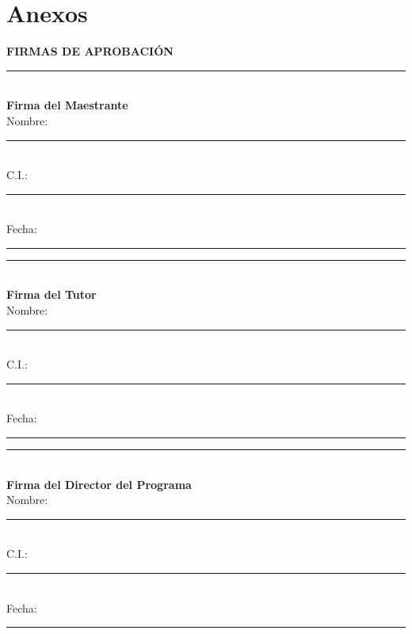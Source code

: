 \documentclass[12pt,a4paper]{report}
\begin{document}


\tableofcontents
\listoffigures
\listoftables

\lstlistoflistings

\newpage










\part*{Anexos}


\newpage
\thispagestyle{empty} %
\vspace*{3cm}

\begin{center}
\Large\textbf{FIRMAS DE APROBACIÓN}
\end{center}

\vspace{4cm}

\begin{minipage}[t]{0.45\textwidth}
\centering
\rule{8cm}{0.5pt}\\[0.5cm]
\textbf{Firma del Maestrante}\\[0.3cm]
Nombre: \rule{6cm}{0.5pt}\\[0.3cm]
C.I.: \rule{4cm}{0.5pt}\\[0.3cm]
Fecha: \rule{4cm}{0.5pt}
\end{minipage}
\hfill
\begin{minipage}[t]{0.45\textwidth}
\centering
\rule{8cm}{0.5pt}\\[0.5cm]
\textbf{Firma del Tutor}\\[0.3cm]
Nombre: \rule{6cm}{0.5pt}\\[0.3cm]
C.I.: \rule{4cm}{0.5pt}\\[0.3cm]
Fecha: \rule{4cm}{0.5pt}
\end{minipage}

\vspace{3cm}

\begin{center}
\rule{8cm}{0.5pt}\\[0.5cm]
\textbf{Firma del Director del Programa}\\[0.3cm]
Nombre: \rule{6cm}{0.5pt}\\[0.3cm]
C.I.: \rule{4cm}{0.5pt}\\[0.3cm]
Fecha: \rule{4cm}{0.5pt}
\end{center}
\end{document}
